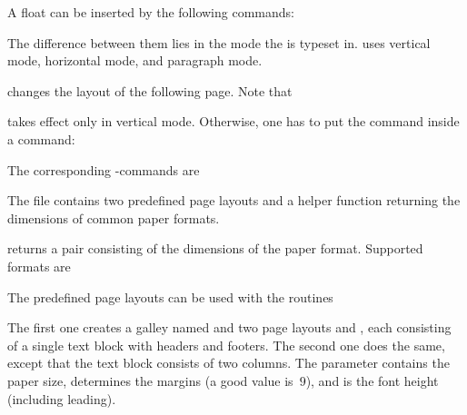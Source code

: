 A float can be inserted by the following commands\?:
\begin{code}
  \cs{\floatbox} 

  \cs{\floatpar} 

  \cs{\floatgalley} 
\end{code}
The difference between them lies in the mode the  is typeset in. \cs{\floatbox} uses
vertical mode, \cs{\floatpar} horizontal mode, and \cs{\floatgalley} paragraph mode.

\begin{code}
  \cs{\nextpagelayout} 
\end{code}
changes the layout of the following page. Note that
\begin{code}
\end{code}
takes effect only in vertical mode. Otherwise, one has to
put the command inside a \cs{\vadjust} command\?:
\begin{code}
\end{code}

The corresponding \AL-commands are
\begin{code}
     

     

       
       
\end{code}

The file  contains two predefined page layouts and a
helper function returning the dimensions of common paper formats.
\begin{code}
   
\end{code}
returns a pair consisting of the dimensions of the paper format.
Supported formats are
\begin{code}
  \quad {}\quad {}\quad {}

  \quad {}\quad {}\quad {}

  \quad {}\quad {}
\end{code}
The predefined page layouts can be used with the routines
\begin{code}
     

     
\end{code}
The first one creates a galley named  and two page layouts
 and , each consisting of a single text block
with headers and footers.
The second one does the same, except that the text block consists of
two columns. The parameter  contains the paper size,
 determines the margins (a good value is~$9$),
and  is the font height (including leading).


